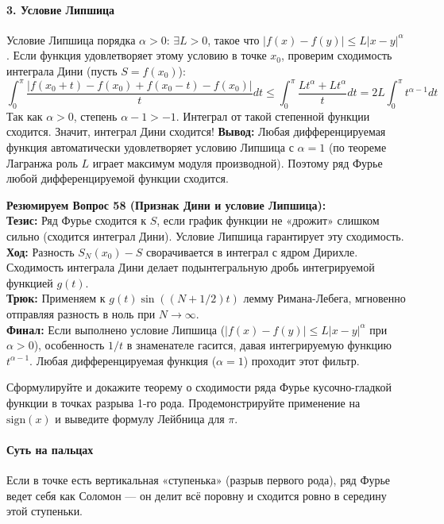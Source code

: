 \paragraph{3. Условие Липшица}
Условие Липшица порядка $\alpha > 0$: $\exists L > 0$, такое что $|f(x) - f(y)| \le L |x-y|^\alpha$. 
Если функция удовлетворяет этому условию в точке $x_0$, проверим сходимость интеграла Дини (пусть $S = f(x_0)$):
$$ \int_0^\pi \frac{|f(x_0+t) - f(x_0) + f(x_0-t) - f(x_0)|}{t} dt \le \int_0^\pi \frac{L t^\alpha + L t^\alpha}{t} dt = 2L \int_0^\pi t^{\alpha-1} dt $$
Так как $\alpha > 0$, степень $\alpha - 1 > -1$. Интеграл от такой степенной функции сходится. Значит, интеграл Дини сходится! 
\textbf{Вывод:} Любая дифференцируемая функция автоматически удовлетворяет условию Липшица с $\alpha=1$ (по теореме Лагранжа роль $L$ играет максимум модуля производной). Поэтому ряд Фурье любой дифференцируемой функции сходится.
\begin{tcolorbox}[colback=gray!5, colframe=black, boxrule=0.5pt, arc=0pt]
\textbf{Резюмируем Вопрос 58 (Признак Дини и условие Липшица):} \\
\textbf{Тезис:} Ряд Фурье сходится к $S$, если график функции не «дрожит» слишком сильно (сходится интеграл Дини). Условие Липшица гарантирует эту сходимость. \\
\textbf{Ход:} Разность $S_N(x_0) - S$ сворачивается в интеграл с ядром Дирихле. Сходимость интеграла Дини делает подынтегральную дробь интегрируемой функцией $g(t)$. \\
\textbf{Трюк:} Применяем к $g(t) \sin((N+1/2)t)$ лемму Римана-Лебега, мгновенно отправляя разность в ноль при $N \to \infty$. \\
\textbf{Финал:} Если выполнено условие Липшица ($|f(x)-f(y)| \le L|x-y|^\alpha$ при $\alpha>0$), особенность $1/t$ в знаменателе гасится, давая интегрируемую функцию $t^{\alpha-1}$. Любая дифференцируемая функция ($\alpha=1$) проходит этот фильтр.
\end{tcolorbox}
{Сформулируйте и докажите теорему о сходимости ряда Фурье кусочно-гладкой функции в точках разрыва 1-го рода. Продемонстрируйте применение на $\text{sign}(x)$ и выведите формулу Лейбница для $\pi$.}

\paragraph{Суть на пальцах}
Если в точке есть вертикальная «ступенька» (разрыв первого рода), ряд Фурье ведет себя как Соломон — он делит всё поровну и сходится ровно в середину этой ступеньки.

